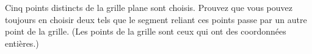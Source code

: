 Cinq points distincts de la grille plane sont choisis. Prouvez que vous pouvez
toujours en choisir deux tels que le segment reliant ces points passe par un
autre point de la grille. (Les points de la grille sont ceux qui ont des
coordonnées entières.)

\begin{center}
\end{center}
